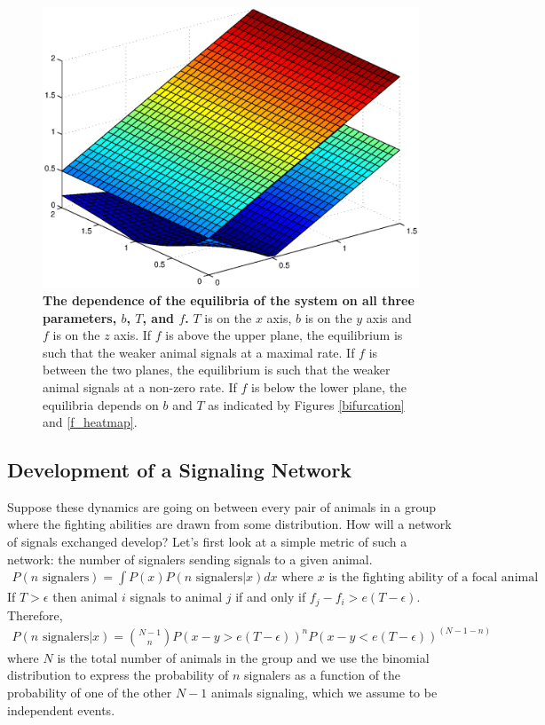 \documentclass{article}
\begin{document}
\begin{figure}
\includegraphics[width=\textwidth]{wireframe_bifurcation_v2.eps}
\caption{{\bf The dependence of the equilibria of the system on all three parameters, $b$, $T$, and $f$.} $T$ is on the $x$ axis, $b$ is on the $y$ axis and $f$ is on the $z$ axis.  If $f$ is above the upper plane, the equilibrium is such that the weaker animal signals at a maximal rate.  If $f$ is between the two planes, the equilibrium is such that the weaker animal signals at a non-zero rate.  If $f$ is below the lower plane, the equilibria depends on $b$ and $T$ as indicated by Figures \ref{bifurcation} and \ref{f_heatmap}. \label{wireframe}}
\end{figure}

\subsection{Development of a Signaling Network }
Suppose these dynamics are going on between every pair of animals in a group where the fighting abilities are drawn from some distribution.  How will a network of signals exchanged develop?  Let's first look at a simple metric of such a network: the number of signalers sending signals to a given animal.  
\begin{align*}
P(n \text{ signalers})=\int P(x)P(n \text{ signalers}|x)dx \text{ where $x$ is the fighting ability of a focal animal}
\end{align*}
If $T>\epsilon$ then animal $i$ signals to animal $j$ if and only if $f_j-f_i>e(T-\epsilon)$.  Therefore,
\begin{align*}
P(n \text{ signalers}|x)={N-1 \choose n}P(x-y>e(T-\epsilon))^nP(x-y<e(T-\epsilon))^{(N-1-n)}
\end{align*}
where $N$ is the total number of animals in the group and we use the binomial distribution to express the probability of $n$ signalers as a function of the probability of one of the other $N-1$ animals signaling, which we assume to be independent events.
\end{document}
